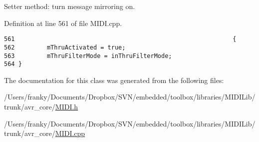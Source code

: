 Setter method: turn message mirroring on. 

Definition at line 561 of file MIDI.cpp.

\begin{Code}\begin{verbatim}561                                                             { 
562         mThruActivated = true;
563         mThruFilterMode = inThruFilterMode;
564 }
\end{verbatim}
\end{Code}




The documentation for this class was generated from the following files:\begin{CompactItemize}
\item 
/Users/franky/Documents/Dropbox/SVN/embedded/toolbox/libraries/MIDILib/trunk/avr\_\-core/\hyperlink{_m_i_d_i_8h}{MIDI.h}\item 
/Users/franky/Documents/Dropbox/SVN/embedded/toolbox/libraries/MIDILib/trunk/avr\_\-core/\hyperlink{_m_i_d_i_8cpp}{MIDI.cpp}\end{CompactItemize}
